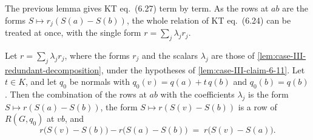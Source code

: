 The previous lemma gives KT eq.~(6.27) term by term. As the rows at $ab$
are the forms $S \mapsto r_j(S(a) - S(b))$, the whole relation of KT
eq.~(6.24) can be treated at once, with the single form
$r = \sum_j \lambda_j r_j$.

\begin{lemma}
  \label{lem:case-III-candidate-row-construction}
  \leanok
  Let $r = \sum_j \lambda_j r_j$, where the forms $r_j$ and the scalars
  $\lambda_j$ are those of \cref{lem:case-III-redundant-decomposition},
  under the hypotheses of \cref{lem:case-III-claim-6-11}. Let $t \in K$,
  and let $q_0$ be normals with $q_0(v) = q(a) + t\,q(b)$ and
  $q_0(b) = q(b)$. Then the combination of the rows at $ab$ with the
  coefficients $\lambda_j$ is the form $S \mapsto r(S(a) - S(b))$, the
  form $S \mapsto r(S(v) - S(b))$ is a row of $R(G, q_0)$ at $vb$, and
  \[
    r\bigl(S(v) - S(b)\bigr) - r\bigl(S(a) - S(b)\bigr)
    \;=\; r\bigl(S(v) - S(a)\bigr).
  \]
\end{lemma}
